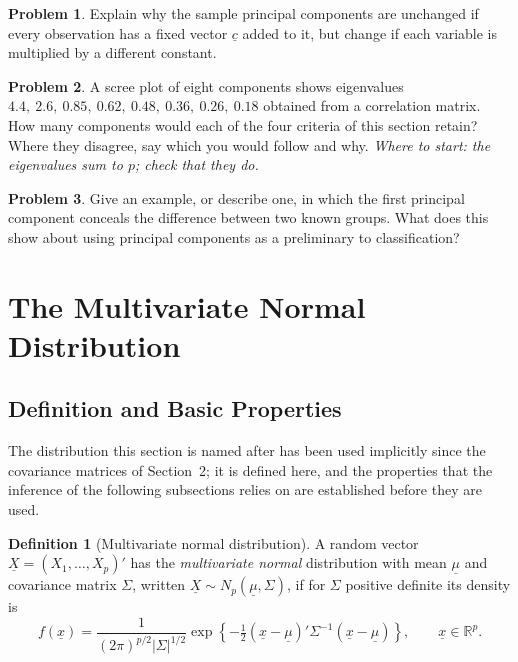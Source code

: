 \documentclass[11pt,a4paper]{article}
\theoremstyle{definition}
\newtheorem{defn}[thm]{Definition}
\newtheorem{problemx}{Problem}[section]
\newenvironment{problem}{\begin{problemx}}{\end{problemx}}
\begin{document}
\begin{problem}
Explain why the sample principal components are unchanged if every observation
has a fixed vector $\underline{c}$ added to it, but change if each variable is
multiplied by a different constant.
\end{problem}

\begin{problem}
A scree plot of eight components shows eigenvalues
$4.4,\ 2.6,\ 0.85,\ 0.62,\ 0.48,\ 0.36,\ 0.26,\ 0.18$ obtained from a
correlation matrix. How many components would each of the four criteria of this
section retain? Where they disagree, say which you would follow and why.
\emph{Where to start: the eigenvalues sum to $p$; check that they do.}
\end{problem}

\begin{problem}
Give an example, or describe one, in which the first principal component
conceals the difference between two known groups. What does this show about
using principal components as a preliminary to classification?
\end{problem}


\section{The Multivariate Normal Distribution}

\subsection{Definition and Basic Properties}

The distribution this section is named after has been used implicitly since the
covariance matrices of Section~2; it is defined here, and the properties that
the inference of the following subsections relies on are established before
they are used.

\begin{defn}[Multivariate normal distribution]
A random vector $\underline{X} = (X_1,\dots,X_p)'$ has the \emph{multivariate
normal} distribution with mean $\underline{\mu}$ and covariance matrix $\Sigma$,
written $\underline{X}\sim N_p(\underline{\mu},\Sigma)$, if for
$\Sigma$ positive definite its density is
$$f(\underline{x}) = \frac{1}{(2\pi)^{p/2}\left|\Sigma\right|^{1/2}}
\exp\left\{-\tfrac{1}{2}\left(\underline{x}-\underline{\mu}\right)'
\Sigma^{-1}\left(\underline{x}-\underline{\mu}\right)\right\},
\qquad \underline{x}\in\mathbb{R}^{p}.$$
\end{defn}
\end{document}
